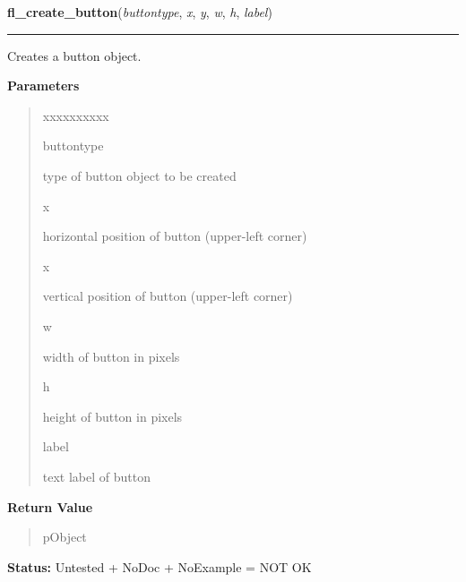     \label{xformslib:library:fl_create_button}

    \vspace{0.5ex}

\hspace{.8\funcindent}\begin{boxedminipage}{\funcwidth}

    \raggedright \textbf{fl\_create\_button}(\textit{buttontype}, \textit{x}, \textit{y}, \textit{w}, \textit{h}, \textit{label})

    \vspace{-1.5ex}

    \rule{\textwidth}{0.5\fboxrule}
\setlength{\parskip}{2ex}
    Creates a button object.

\setlength{\parskip}{1ex}
      \textbf{Parameters}
      \vspace{-1ex}

      \begin{quote}
        \begin{Ventry}{xxxxxxxxxx}

          \item[buttontype]

          type of button object to be created

          \item[x]

          horizontal position of button (upper-left corner)

          \item[x]

          vertical position of button (upper-left corner)

          \item[w]

          width of button in pixels

          \item[h]

          height of button in pixels

          \item[label]

          text label of button

        \end{Ventry}

      \end{quote}

      \textbf{Return Value}
    \vspace{-1ex}

      \begin{quote}
      pObject

      \end{quote}

\textbf{Status:} Untested + NoDoc + NoExample = NOT OK



    \end{boxedminipage}

